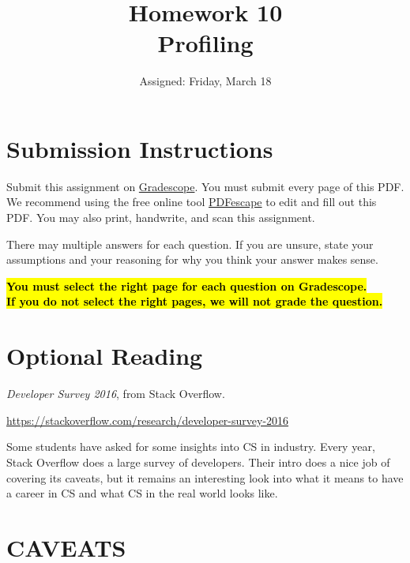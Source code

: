 \documentclass{article}
\begin{document}
\fancyhead[L]{}
\fancyhead[R]{}

\fancyfoot[C]{\color{gray} \thepage~/~\pageref*{LastPage}}
\pagestyle{fancyplain}



\title{\textbf{Homework 10\\Profiling}}
\author{Assigned: Friday, March 18}
\date{\textbf{\color{red}{Due: Friday, March 25, 11:00AM (Hard Deadline)}}}
\maketitle


\section*{Submission Instructions}
Submit this assignment on \href{https://gradescope.com/courses/2248}{Gradescope}.
You must submit every page of this PDF.
We recommend using the free online tool \href{https://www.pdfescape.com}{PDFescape}
to edit and fill out this PDF.
You may also print, handwrite, and scan this assignment.

There may multiple answers for each question. If you are unsure,
state your assumptions and your reasoning for why you think your answer
makes sense.

\textbf{\hl{You must select the right page for each question on Gradescope.\\
    If you do not select the right pages, we will not grade the question.}}

\section*{Optional Reading}

\emph{Developer Survey 2016}, from Stack Overflow.

\url{https://stackoverflow.com/research/developer-survey-2016}

Some students have asked for some insights into CS in industry. Every year,
Stack Overflow does a large survey of developers. Their intro does a nice job
of covering its caveats, but it remains an interesting look into what it means
to have a career in CS and what CS in the real world looks like.


\section*{CAVEATS}
\end{document}
